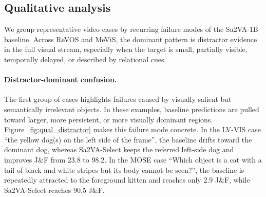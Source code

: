 \begin{table}[t]
\caption{Performance on image-level benchmarks for MLLMs with segmentation capability, adapted from the original Sa2VA image-level summary table.
We report standard scores for MMBench, SEED-Bench, AI2D, MMStar, MMMU, and SQA$^{\mathrm{test}}$, and cIoU for RefCOCO/RefCOCO+/RefCOCOg.
For MME, A/B denotes the perception (A) and cognition (B) scores, respectively.
The ``Avg'' column reports the relative average w.r.t. Sa2VA-1B (100\%).}
\label{tab:image_level_bench_sa2va1b_dev}
\centering
\scriptsize
\setlength{\tabcolsep}{3.0pt}
\end{table}

\subsection{Qualitative analysis}
\label{sec:exp_qualitative}
We group representative video cases by recurring failure modes of the Sa2VA-1B baseline.
Across ReVOS and MeViS, the dominant pattern is distractor evidence in the full visual stream, especially when the target is small, partially visible, temporally delayed, or described by relational cues.

\paragraph{Distractor-dominant confusion.}
The first group of cases highlights failures caused by visually salient but semantically irrelevant objects.
In these examples, baseline predictions are pulled toward larger, more persistent, or more visually dominant regions.
Figure~\ref{fig:qual_distractor} makes this failure mode concrete.
In the LV-VIS case ``the yellow dog(s) on the left side of the frame'', the baseline drifts toward the dominant dog, whereas Sa2VA-Select keeps the referred left-side dog and improves J\&F from 23.8 to 98.2.
In the MOSE case ``Which object is a cat with a tail of black and white stripes but its body cannot be seen?'', the baseline is repeatedly attracted to the foreground kitten and reaches only 2.9 J\&F, while Sa2VA-Select reaches 90.5 J\&F.

